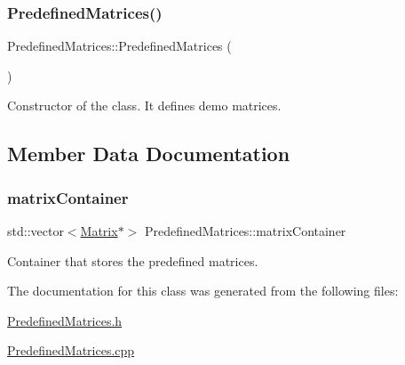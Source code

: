 \subsubsection{\texorpdfstring{Predefined\+Matrices()}{PredefinedMatrices()}}
{\footnotesize\ttfamily Predefined\+Matrices\+::\+Predefined\+Matrices (\begin{DoxyParamCaption}{ }\end{DoxyParamCaption})}



Constructor of the class. It defines demo matrices. 



\subsection{Member Data Documentation}
\mbox{\label{class_predefined_matrices_a2db167eb7f3e7d15bd8201e122f581c4}} 
\subsubsection{\texorpdfstring{matrix\+Container}{matrixContainer}}
{\footnotesize\ttfamily std\+::vector$<$\hyperlink{class_matrix}{Matrix}$\ast$$>$ Predefined\+Matrices\+::matrix\+Container}



Container that stores the predefined matrices. 



The documentation for this class was generated from the following files\+:\begin{DoxyCompactItemize}
\item 
\hyperlink{_predefined_matrices_8h}{Predefined\+Matrices.\+h}\item 
\hyperlink{_predefined_matrices_8cpp}{Predefined\+Matrices.\+cpp}\end{DoxyCompactItemize}
